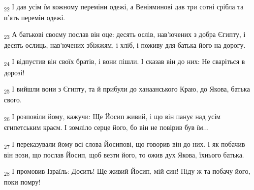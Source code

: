 \begin{tcolorbox}
\textsubscript{22} І дав усім їм кожному переміни одежі, а Веніяминові дав три сотні срібла та п'ять перемін одежі.
\end{tcolorbox}
\begin{tcolorbox}
\textsubscript{23} А батькові своєму послав він оце: десять ослів, нав'ючених з добра Єгипту, і десять ослиць, нав'ючених збіжжям, і хліб, і поживу для батька його на дорогу.
\end{tcolorbox}
\begin{tcolorbox}
\textsubscript{24} І відпустив він своїх братів, і вони пішли. І сказав він до них: Не сваріться в дорозі!
\end{tcolorbox}
\begin{tcolorbox}
\textsubscript{25} І вийшли вони з Єгипту, та й прибули до ханаанського Краю, до Якова, батька свого.
\end{tcolorbox}
\begin{tcolorbox}
\textsubscript{26} І розповіли йому, кажучи: Ще Йосип живий, і що він панує над усім єгипетським краєм. І зомліло серце його, бо він не повірив був їм...
\end{tcolorbox}
\begin{tcolorbox}
\textsubscript{27} І переказували йому всі слова Йосипові, що говорив він до них. І як побачив він вози, що послав Йосип, щоб везти його, то ожив дух Якова, їхнього батька.
\end{tcolorbox}
\begin{tcolorbox}
\textsubscript{28} І промовив Ізраїль: Досить! Ще живий Йосип, мій син! Піду ж та побачу його, поки помру!
\end{tcolorbox}
